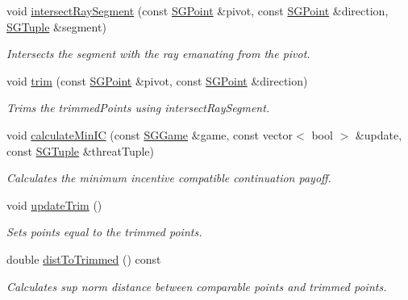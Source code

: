 \begin{DoxyCompactItemize}
void \hyperlink{classSGAction_a3c356d4fdf210ff3f0f62cdff8f6f257}{intersect\+Ray\+Segment} (const \hyperlink{classSGPoint}{S\+G\+Point} \&pivot, const \hyperlink{classSGPoint}{S\+G\+Point} \&direction, \hyperlink{classSGTuple}{S\+G\+Tuple} \&segment)
\begin{DoxyCompactList}\small\item\em Intersects the segment with the ray emanating from the pivot. \end{DoxyCompactList}\item 
\mbox{\label{classSGAction_a8e90e30336fb9402cbb30a00215f6931}} 
void \hyperlink{classSGAction_a8e90e30336fb9402cbb30a00215f6931}{trim} (const \hyperlink{classSGPoint}{S\+G\+Point} \&pivot, const \hyperlink{classSGPoint}{S\+G\+Point} \&direction)
\begin{DoxyCompactList}\small\item\em Trims the trimmed\+Points using intersect\+Ray\+Segment. \end{DoxyCompactList}\item 
\mbox{\label{classSGAction_a175b7f97c90b86d58a994eb5b42161e9}} 
void \hyperlink{classSGAction_a175b7f97c90b86d58a994eb5b42161e9}{calculate\+Min\+IC} (const \hyperlink{classSGGame}{S\+G\+Game} \&game, const vector$<$ bool $>$ \&update, const \hyperlink{classSGTuple}{S\+G\+Tuple} \&threat\+Tuple)
\begin{DoxyCompactList}\small\item\em Calculates the minimum incentive compatible continuation payoff. \end{DoxyCompactList}\item 
\mbox{\label{classSGAction_a3d8c9d0bc1022b0348a7ba1c7a158118}} 
void \hyperlink{classSGAction_a3d8c9d0bc1022b0348a7ba1c7a158118}{update\+Trim} ()
\begin{DoxyCompactList}\small\item\em Sets points equal to the trimmed points. \end{DoxyCompactList}\item 
\mbox{\label{classSGAction_ae5779968293b5483524919185d2ce248}} 
double \hyperlink{classSGAction_ae5779968293b5483524919185d2ce248}{dist\+To\+Trimmed} () const
\begin{DoxyCompactList}\small\item\em Calculates sup norm distance between comparable points and trimmed points. \end{DoxyCompactList}\item 

\end{DoxyCompactItemize}
